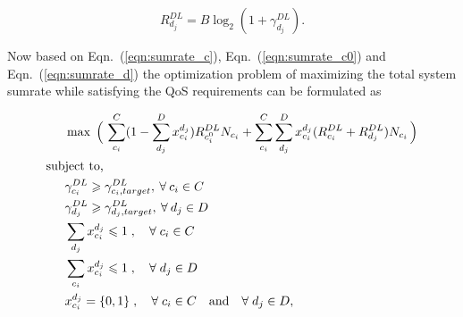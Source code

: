 \documentclass[times]{dacauth}
\begin{document}
\begin{equation}\label{eqn:sumrate_d}
	R_{d_j}^{DL} = B\log_{2}(1+\gamma_{d_j}^{DL}).
\end{equation}
%

\noindent
Now based on Eqn.~(\ref{eqn:sumrate_c}), Eqn.~(\ref{eqn:sumrate_c0}) and Eqn.~(\ref{eqn:sumrate_d}) the optimization problem of maximizing the total system sumrate while satisfying the QoS requirements can be formulated as 

\begin{align}
&\max \; \Big(\, \sum_{c_i}^{C} (1-\sum_{d_j}^{D}x_{c_i}^{d_j}) R_{c_i^0}^{DL}N_{c_i} + \sum_{c_i}^{C}\sum_{d_j}^{D} x_{c_i}^{d_j}(R_{c_i}^{DL} +  R_{d_j}^{DL})N_{c_i} \, \Big) \label{eqn:objective} \\
\text{sub}&\text{ject}\text{ to,}\notag\\
&\gamma_{c_i}^{DL} \geqslant \gamma_{c_i,target}^{DL}, \: \forall \:c_i\in C \label{eqn:constraintC} \\
&\gamma_{d_j}^{DL} \geqslant \gamma_{d_j,target}^{DL}, \: \forall \:d_j\in D \label{eqn:constraintD}\\
&\sum_{d_j} x_{c_i}^{d_j} \leqslant 1\;,\quad \forall \;c_i \in C \label{eqn:constraintxc}\\
&\sum_{c_i} x_{c_i}^{d_j} \leqslant 1\;,\quad \forall \;d_j \in D \label{eqn:constraintxd}\\
&x_{c_i}^{d_j} = \{0,1\}\;,  		 \quad \forall \;c_i \in C \quad  \text{and} \quad \forall \;d_j \in D, \label{eqn:constraintx}
\end{align}
\end{document}
